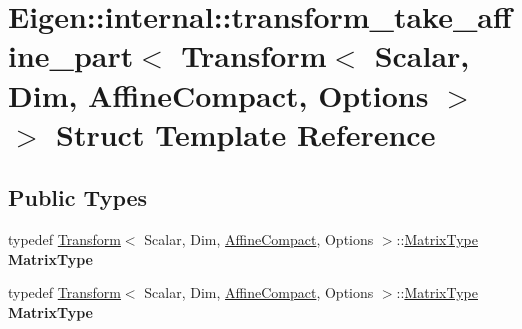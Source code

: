 \hypertarget{struct_eigen_1_1internal_1_1transform__take__affine__part_3_01_transform_3_01_scalar_00_01_dim_08d14c40ff031aad52694585e78471f26}{}\section{Eigen\+:\+:internal\+:\+:transform\+\_\+take\+\_\+affine\+\_\+part$<$ Transform$<$ Scalar, Dim, Affine\+Compact, Options $>$ $>$ Struct Template Reference}
\label{struct_eigen_1_1internal_1_1transform__take__affine__part_3_01_transform_3_01_scalar_00_01_dim_08d14c40ff031aad52694585e78471f26}
\subsection*{Public Types}
\begin{DoxyCompactItemize}
\item 
\mbox{\label{struct_eigen_1_1internal_1_1transform__take__affine__part_3_01_transform_3_01_scalar_00_01_dim_08d14c40ff031aad52694585e78471f26_a632080f63098e5039fd648d427f0e612}} 
typedef \hyperlink{group___geometry___module_class_eigen_1_1_transform}{Transform}$<$ Scalar, Dim, \hyperlink{group__enums_ggaee59a86102f150923b0cac6d4ff05107aa30a06b60d218b709020972df47de2b0}{Affine\+Compact}, Options $>$\+::\hyperlink{group___core___module_class_eigen_1_1_matrix}{Matrix\+Type} {\bfseries Matrix\+Type}
\item 
\mbox{\label{struct_eigen_1_1internal_1_1transform__take__affine__part_3_01_transform_3_01_scalar_00_01_dim_08d14c40ff031aad52694585e78471f26_a632080f63098e5039fd648d427f0e612}} 
typedef \hyperlink{group___geometry___module_class_eigen_1_1_transform}{Transform}$<$ Scalar, Dim, \hyperlink{group__enums_ggaee59a86102f150923b0cac6d4ff05107aa30a06b60d218b709020972df47de2b0}{Affine\+Compact}, Options $>$\+::\hyperlink{group___core___module_class_eigen_1_1_matrix}{Matrix\+Type} {\bfseries Matrix\+Type}
\end{DoxyCompactItemize}
